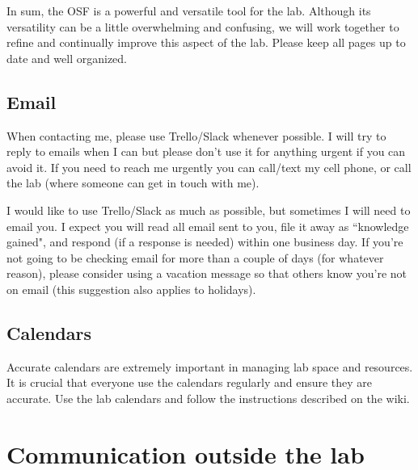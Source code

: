 \documentclass[letterpaper,12pt,oneside]{memoir}
\begin{document}
\begin{shaded}
\noindent In sum, the OSF is a powerful and versatile tool for the lab. Although its versatility can be a little overwhelming and confusing, we will work together to refine and continually improve this aspect of the lab. Please keep all pages up to date and well organized. 
\end{shaded}

\subsection{Email}
When contacting me, please use Trello/Slack whenever possible. I will try to reply to emails when I can but please don't use it for anything urgent if you can avoid it. If you need to reach me urgently you can call/text my cell phone, or call the lab (where someone can get in touch with me). 

I would like to use Trello/Slack as much as possible, but sometimes I will need to email you. I expect you will read all email sent to you, file it away as ``knowledge gained", and respond (if a response is needed) within one business day. If you're not going to be checking email for more than a couple of days (for whatever reason), please consider using a vacation message so that others know you're not on email (this suggestion also applies to holidays).


\subsection{Calendars}

Accurate calendars are extremely important in managing lab space and resources. It is crucial that everyone use the calendars regularly and ensure they are accurate. Use the lab calendars and follow the instructions described on the wiki.






\section{Communication outside the lab}
\end{document}
